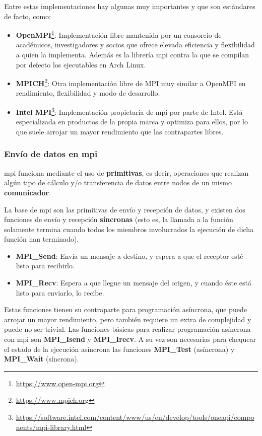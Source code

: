 Entre estas implementaciones hay algunas muy importantes y que son estándares de facto, como:
\begin{itemize}
  \item\textbf{OpenMPI}\footnote{\url{https://www.open-mpi.org}}: Implementación libre mantenida por un consorcio de académicos, investigadores y socios que ofrece elevada eficiencia y flexibilidad a quien la implementa. Además es la librería \acrshort{mpi} contra la que se compilan por defecto los ejecutables en Arch Linux.
  \item\textbf{MPICH}\footnote{\url{https://www.mpich.org}}: Otra implementación libre de MPI muy similar a OpenMPI en rendimiento, flexibilidad y modo de desarrollo.
  \item\textbf{Intel MPI}\footnote{\url{https://software.intel.com/content/www/us/en/develop/tools/oneapi/components/mpi-library.html}}: Implementación propietaria de \acrshort{mpi} por parte de Intel. Está especializada en productos de la propia marca y optimiza para ellos, por lo que suele arrojar un mayor rendimiento que las contrapartes libres.
\end{itemize}

\subsubsection{Envío de datos en \acrshort{mpi}}
\acrshort{mpi} funciona mediante el uso de \textbf{primitivas}, es decir, operaciones que realizan algún tipo de cálculo y/o transferencia de datos entre nodos de un mismo \textbf{comunicador}.

La base de \acrshort{mpi} son las primitivas de envío y recepción de datos, y existen dos funciones de envío y recepción \textbf{síncronas} (esto es, la llamada a la función solamente termina cuando todos los miembros involucrados la ejecución de dicha función han terminado).
\begin{itemize}
  \item \textbf{MPI\_Send}: Envía un mensaje a destino, y espera a que el receptor esté listo para recibirlo. 
  \item \textbf{MPI\_Recv}: Espera a que llegue un mensaje del origen, y cuando éste está listo para enviarlo, lo recibe.
\end{itemize}

Estas funciones tienen su contraparte para programación asíncrona, que puede arrojar un mayor rendimiento, pero también requiere un extra de complejidad y puede no ser trivial. Las funciones básicas para realizar programación asíncrona con \acrshort{mpi} son \textbf{MPI\_Isend} y \textbf{MPI\_Irecv}. A su vez son necesarias para chequear el estado de la ejecución asíncrona las funciones \textbf{MPI\_Test} (asíncrona) y \textbf{MPI\_Wait} (síncrona).

